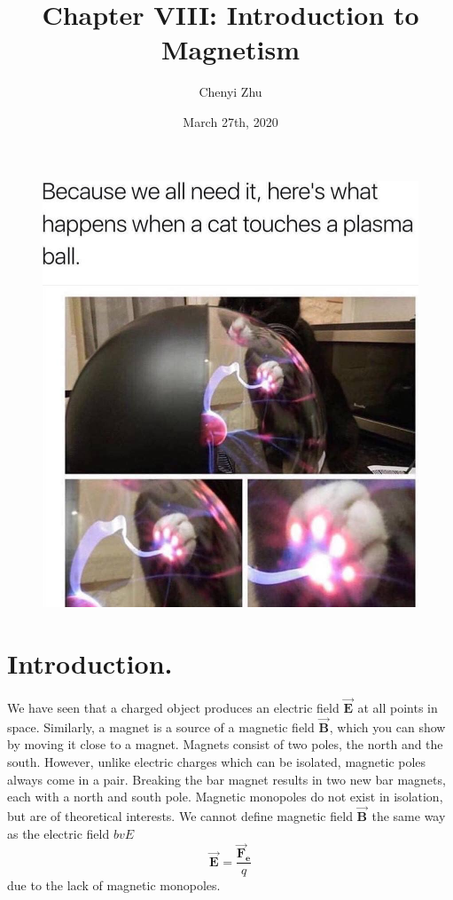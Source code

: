 \documentclass[11pt, letterpaper]{article}
\title{Chapter VIII: Introduction to Magnetism}
\author{Chenyi Zhu}
\date{March 27th, 2020}
\theoremstyle{definition}
\theoremstyle{remark}
\newcommand{\bv}[2][]{\bm{\vec{#2}_{#1}}}
\begin{document}
\begin{titlingpage}
	\maketitle
	
	\begin{figure}[h!]
		\centering
		\includegraphics[scale=0.3]{cat}
		\label{fig:flux}
	\end{figure}
		
\end{titlingpage}

\section{Introduction.}
We have seen that a charged object produces an electric field $\bv{E}$ at all points in space. Similarly, a magnet is a source of a magnetic field $\bv{B}$, which you can show by moving it close to a magnet. Magnets consist of two poles, the north and the south. However, unlike electric charges which can be isolated, magnetic poles always come in a pair. Breaking the bar magnet results in two new bar magnets, each with a north and south pole. Magnetic monopoles do not exist in isolation, but are of theoretical interests. We cannot define magnetic field $\bv{B}$ the same way as the electric field $bv{E}$ \[\bv{E} = \frac{\bv[e]{F}}{q}\] due to the lack of magnetic monopoles. 
\end{document}
